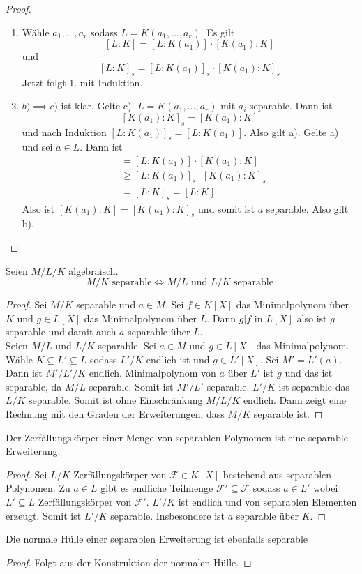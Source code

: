 \begin{proof}
   \begin{enumerate}
       \item  Wähle \(a_1,\dots,a_r\) sodass \(L=K(a_1,\dots,a_r)\). 
    Es gilt \[[L:K]=[L:K(a_1)]\cdot[K(a_1):K]\] und 
    \[[L:K]_s=[L:K(a_1)]_s\cdot [K(a_1):K]_s\]
    Jetzt folgt 1. mit Induktion.
    \item \(b)\implies c)\) ist klar. Gelte c). \(L=K(a_1,\dots,a_r)\) mit \(a_i\) separable.
    Dann ist \[[K(a_1):K]_s=[K(a_1):K]\] und nach Induktion \([L:K(a_1)]_s=[L:K(a_1)]\). Also gilt a).
    Gelte a) und sei \(a\in L\). Dann ist 
    \begin{align*}
        [L:K]&=[L:K(a_1)]\cdot[K(a_1):K]\\
        & \geq [L:K(a_1)]_s\cdot[K(a_1):K]_s\\
        &=[L:K]_s=[L:K]
    \end{align*}
    Also ist \([K(a_1):K]=[K(a_1):K]_s\) und somit ist \(a\) separable. Also gilt b).
   \end{enumerate}
\end{proof}
\begin{Kor}
    Seien \(M/L/K\) algebraisch.
    \[M/K \text{ separable}\iff M/L \text{ und } L/K\text{ separable }\]
\end{Kor}
\begin{proof}
    Sei \(M/K\) separable und \(a\in M\). Sei \(f\in K[X]\) das Minimalpolynom über \(K\) und \(g\in L[X]\) das Minimalpolynom über \(L\). Dann \(g|f\) in \(L[X]\) also ist \(g\) separable und damit auch \(a\) separable über \(L\).\\
    Seien \(M/L\) und \(L/K\) separable. Sei \(a\in M\) und \(g\in L[X]\) das Minimalpolynom. Wähle \(K\subseteq L'\subseteq L\) sodass \(L'/K\) endlich ist und \(g\in L'[X]\). Sei \(M'=L'(a)\). Dann ist \(M'/L'/K\) endlich. Minimalpolynom von \(a\) über \(L'\) ist \(g\) und das ist separable, da \(M/L\) separable. Somit ist \(M'/L'\) separable. \(L'/K\) ist separable das \(L/K\) separable.
    Somit ist ohne Einschränkung \(M/L/K\) endlich.
    Dann zeigt eine Rechnung mit den Graden der Erweiterungen, dass \(M/K\) separable ist.
\end{proof}
\begin{Kor}
    Der Zerfällungskörper einer Menge von separablen Polynomen ist eine separable Erweiterung.
\end{Kor}
\begin{proof}
    Sei \(L/K\) Zerfällungskörper von \(\mathcal F\in K[X]\) bestehend aus separablen Polynomen. Zu \(a\in L\) gibt es endliche Teilmenge \(\mathcal F'\subseteq \mathcal F\) sodass \(a\in L'\) wobei \(L'\subseteq L\) Zerfällungskörper von \(\mathcal F'.\) \(L'/K\) ist endlich und von separablen Elementen erzeugt. Somit ist \(L'/K\) separable. Insbesondere ist \(a\) separable über \(K\).
\end{proof}
\begin{Kor}
    Die normale Hülle einer separablen Erweiterung ist ebenfalls separable
\end{Kor}
\begin{proof}
    Folgt aus der Konstruktion der normalen Hülle.
\end{proof}

